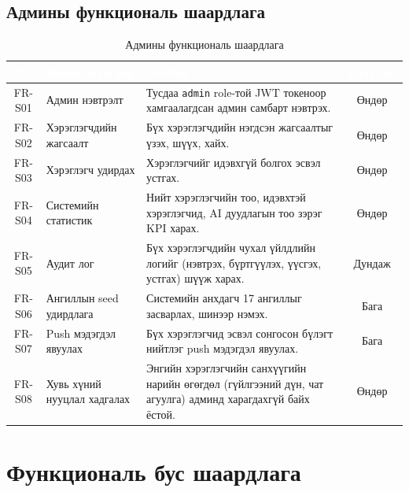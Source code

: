 \subsection{Админы функциональ шаардлага}
\begin{table}[ht]
\centering
\footnotesize
\renewcommand{\arraystretch}{1.25}
\begin{tabular}{|c|p{3.7cm}|p{7cm}|c|}
\hline
\rowcolor{darknavy}
\textcolor{white}{\textbf{ID}} & \textcolor{white}{\textbf{Шаардлагын нэр}} & \textcolor{white}{\textbf{Тайлбар}} & \textcolor{white}{\textbf{Тэргүүлэх}} \\ \hline
FR-S01 & Админ нэвтрэлт               & Тусдаа \texttt{admin} role-той JWT токеноор хамгаалагдсан админ самбарт нэвтрэх. & Өндөр \\ \hline
FR-S02 & Хэрэглэгчдийн жагсаалт       & Бүх хэрэглэгчдийн нэгдсэн жагсаалтыг үзэх, шүүх, хайх. & Өндөр \\ \hline
FR-S03 & Хэрэглэгч удирдах            & Хэрэглэгчийг идэвхгүй болгох эсвэл устгах. & Өндөр \\ \hline
FR-S04 & Системийн статистик          & Нийт хэрэглэгчийн тоо, идэвхтэй хэрэглэгчид, AI дуудлагын тоо зэрэг KPI харах. & Өндөр \\ \hline
FR-S05 & Аудит лог                    & Бүх хэрэглэгчдийн чухал үйлдлийн логийг (нэвтрэх, бүртгүүлэх, үүсгэх, устгах) шүүж харах. & Дундаж \\ \hline
FR-S06 & Ангиллын seed удирдлага      & Системийн анхдагч 17 ангиллыг засварлах, шинээр нэмэх. & Бага \\ \hline
FR-S07 & Push мэдэгдэл явуулах        & Бүх хэрэглэгчид эсвэл сонгосон бүлэгт нийтлэг push мэдэгдэл явуулах. & Бага \\ \hline
FR-S08 & Хувь хүний нууцлал хадгалах  & Энгийн хэрэглэгчийн санхүүгийн нарийн өгөгдөл (гүйлгээний дүн, чат агуулга) админд харагдахгүй байх ёстой. & Өндөр \\ \hline
\end{tabular}
\caption{Админы функциональ шаардлага}
\label{tab:fr-admin}
\end{table}

\section{Функциональ бус шаардлага}

